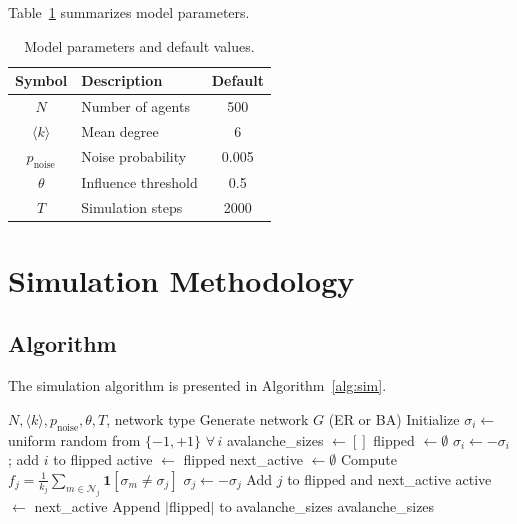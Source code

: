 \documentclass[11pt,twocolumn]{article}
\begin{document}
Table~\ref{tab:params} summarizes model parameters.

\begin{table}[h]
\centering
\caption{Model parameters and default values.}
\label{tab:params}
\begin{tabular}{@{}clc@{}}
\toprule
Symbol & Description & Default \\
\midrule
$N$ & Number of agents & 500 \\
$\langle k \rangle$ & Mean degree & 6 \\
$p_{\text{noise}}$ & Noise probability & 0.005 \\
$\theta$ & Influence threshold & 0.5 \\
$T$ & Simulation steps & 2000 \\
\bottomrule
\end{tabular}
\end{table}

\section{Simulation Methodology}

\subsection{Algorithm}

The simulation algorithm is presented in Algorithm~\ref{alg:sim}.

\begin{algorithm}[h]
\caption{Opinion Dynamics Simulation}
\label{alg:sim}
\begin{algorithmic}[1]
\REQUIRE $N, \langle k \rangle, p_{\text{noise}}, \theta, T$, network type
\STATE Generate network $G$ (ER or BA)
\STATE Initialize $\sigma_i \leftarrow$ uniform random from $\{-1, +1\}$ $\forall\, i$
\STATE avalanche\_sizes $\leftarrow []$
\STATE flipped $\leftarrow \emptyset$ 
\STATE $\sigma_i \leftarrow -\sigma_i$; add $i$ to flipped
\ENDIF
\ENDFOR
\STATE active $\leftarrow$ flipped 
\STATE next\_active $\leftarrow \emptyset$
\STATE Compute $f_j = \frac{1}{k_j}\sum_{m \in \mathcal{N}_j} \mathbf{1}[\sigma_m \neq \sigma_j]$
\STATE $\sigma_j \leftarrow -\sigma_j$
\STATE Add $j$ to flipped and next\_active
\ENDIF
\ENDFOR
\STATE active $\leftarrow$ next\_active
\ENDWHILE
\STATE Append $|$flipped$|$ to avalanche\_sizes
\ENDFOR
\RETURN avalanche\_sizes
\end{algorithmic}
\end{algorithm}
\end{document}
